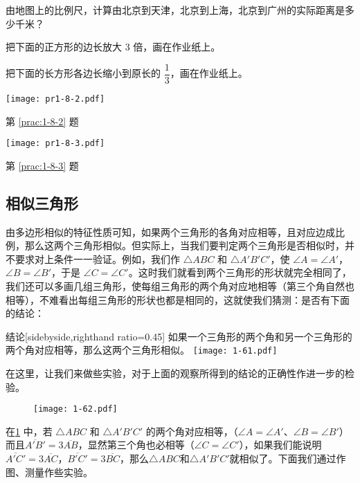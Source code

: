 \begin{Practice}
\begin{question}[itemsep=5pt]
	\item 由地图上的比例尺，计算由北京到天津，北京到上海，北京到广州的实际距离是多少千米？
	\item\label{prac:1-8-2} 把下面的正方形的边长放大 3 倍，画在作业纸上。
	\item\label{prac:1-8-3} 把下面的长方形各边长缩小到原长的 $\dfrac{1}{3}$，画在作业纸上。
	\begin{figurehere}
		\begin{minipage}[b]{0.48\linewidth}
			\centering
			\texttt{[image: pr1-8-2.pdf]}
			\caption*{第 \ref{prac:1-8-2} 题}
		\end{minipage}
		\begin{minipage}[b]{0.48\linewidth}
			\centering
			\texttt{[image: pr1-8-3.pdf]}
			\caption*{第 \ref{prac:1-8-3} 题}
		\end{minipage}
	\end{figurehere}
\end{question}
\end{Practice}

\subsection{相似三角形}
由多边形相似的特征性质可知，如果两个三角形的各角对应相等，且对应边成比例，那么这两个三角形相似。但实际上，当我们要判定两个三角形是否相似时，并不要求对上条件一一验证。例如，我们作 $\triangle ABC$ 和 $\triangle A'B'C'$，使 $\angle A=\angle A'$，$\angle B=\angle B'$，于是 $\angle C=\angle C'$。这时我们就看到两个三角形的形状就完全相同了，我们还可以多画几组三角形，使每组三角形的两个角对应地相等（第三个角自然也相等），不难看出每组三角形的形状也都是相同的，这就使我们猜测：是否有下面的结论：

\begin{Theorem}{结论}[sidebyside,righthand ratio=0.45]
如果一个三角形的两个角和另一个三角形的两个角对应相等，那么这两个三角形相似。
\tcblower 
\texttt{[image: 1-61.pdf]}
	\label{fig:1-61}
\end{Theorem}

在这里，让我们来做些实验，对于上面的观察所得到的结论的正确性作进一步的检验。
\begin{figure}
  \texttt{[image: 1-62.pdf]}
	\caption{}\label{fig:1-62}
\end{figure}

在\cref{fig:1-62} 中，若 $\triangle ABC$ 和 $\triangle A'B'C'$ 的两个角对应相等，（$\angle A=\angle A'$、$\angle B=\angle B'$）而且$\overline{A'B'}=3\overline{AB}$，显然第三个角也必相等（$\angle C=\angle C'$），如果我们能说明 $\overline{A'C'}=3\overline{AC}$，$\overline{B'C'}=3\overline{BC}$，那么$\triangle ABC$和$\triangle A'B'C'$就相似了。下面我们通过作图、测量作些实验。

